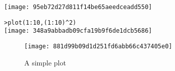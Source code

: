 \documentclass{article}
\begin{document}
%
\texttt{[image: 95eb72d27d811f14be65aeedceadd550]}

%
\begin{alltt}
> plot(1:10, (1:10) ^ 2) 
\texttt{[image: 348a9abbadb09cfa19b9f6de1dcb5686]}
\end{alltt}


%
\begin{figure}[htpb]
  \centering
  \texttt{[image: 881d99b09d1d251fd6abb66c437405e0]}
  \caption{A simple plot}
  \label{fig:ggplot2}
\end{figure}
\end{document}
